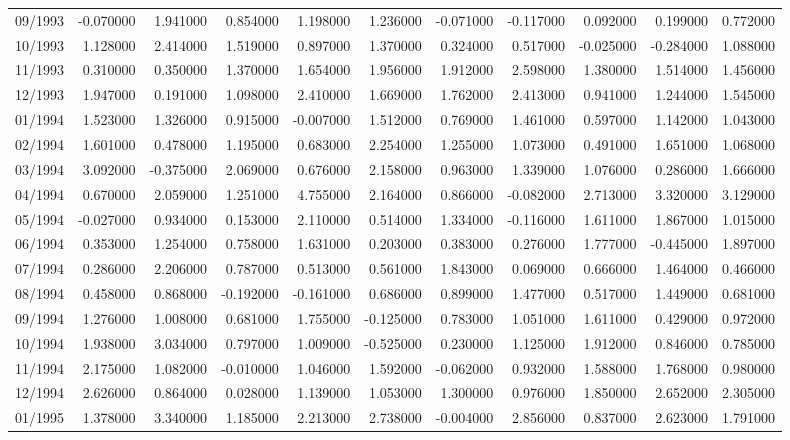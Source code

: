\begin{tabular}{lrrrrrrrrrr}
09/1993 & -0.070000 & 1.941000 & 0.854000 & 1.198000 & 1.236000 & -0.071000 & -0.117000 & 0.092000 & 0.199000 & 0.772000 \\
10/1993 & 1.128000 & 2.414000 & 1.519000 & 0.897000 & 1.370000 & 0.324000 & 0.517000 & -0.025000 & -0.284000 & 1.088000 \\
11/1993 & 0.310000 & 0.350000 & 1.370000 & 1.654000 & 1.956000 & 1.912000 & 2.598000 & 1.380000 & 1.514000 & 1.456000 \\
12/1993 & 1.947000 & 0.191000 & 1.098000 & 2.410000 & 1.669000 & 1.762000 & 2.413000 & 0.941000 & 1.244000 & 1.545000 \\
01/1994 & 1.523000 & 1.326000 & 0.915000 & -0.007000 & 1.512000 & 0.769000 & 1.461000 & 0.597000 & 1.142000 & 1.043000 \\
02/1994 & 1.601000 & 0.478000 & 1.195000 & 0.683000 & 2.254000 & 1.255000 & 1.073000 & 0.491000 & 1.651000 & 1.068000 \\
03/1994 & 3.092000 & -0.375000 & 2.069000 & 0.676000 & 2.158000 & 0.963000 & 1.339000 & 1.076000 & 0.286000 & 1.666000 \\
04/1994 & 0.670000 & 2.059000 & 1.251000 & 4.755000 & 2.164000 & 0.866000 & -0.082000 & 2.713000 & 3.320000 & 3.129000 \\
05/1994 & -0.027000 & 0.934000 & 0.153000 & 2.110000 & 0.514000 & 1.334000 & -0.116000 & 1.611000 & 1.867000 & 1.015000 \\
06/1994 & 0.353000 & 1.254000 & 0.758000 & 1.631000 & 0.203000 & 0.383000 & 0.276000 & 1.777000 & -0.445000 & 1.897000 \\
07/1994 & 0.286000 & 2.206000 & 0.787000 & 0.513000 & 0.561000 & 1.843000 & 0.069000 & 0.666000 & 1.464000 & 0.466000 \\
08/1994 & 0.458000 & 0.868000 & -0.192000 & -0.161000 & 0.686000 & 0.899000 & 1.477000 & 0.517000 & 1.449000 & 0.681000 \\
09/1994 & 1.276000 & 1.008000 & 0.681000 & 1.755000 & -0.125000 & 0.783000 & 1.051000 & 1.611000 & 0.429000 & 0.972000 \\
10/1994 & 1.938000 & 3.034000 & 0.797000 & 1.009000 & -0.525000 & 0.230000 & 1.125000 & 1.912000 & 0.846000 & 0.785000 \\
11/1994 & 2.175000 & 1.082000 & -0.010000 & 1.046000 & 1.592000 & -0.062000 & 0.932000 & 1.588000 & 1.768000 & 0.980000 \\
12/1994 & 2.626000 & 0.864000 & 0.028000 & 1.139000 & 1.053000 & 1.300000 & 0.976000 & 1.850000 & 2.652000 & 2.305000 \\
01/1995 & 1.378000 & 3.340000 & 1.185000 & 2.213000 & 2.738000 & -0.004000 & 2.856000 & 0.837000 & 2.623000 & 1.791000 \\

\end{tabular}
